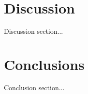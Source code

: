 \section{Discussion}
Discussion section...\par

\section{Conclusions}
Conclusion section...\par

\renewcommand\bibname{{References}}



